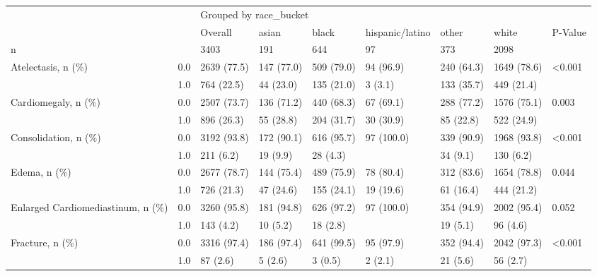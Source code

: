\begin{tabular}{lllllllll}
\toprule
                       &     & \multicolumn{7}{l}{Grouped by race\_bucket} \\
                       &     &                Overall &        asian &       black & hispanic/latino &       other &        white & P-Value \\
\midrule
n & {} &                   3403 &          191 &         644 &              97 &         373 &         2098 &         \\
Atelectasis, n (\%) & 0.0 &            2639 (77.5) &   147 (77.0) &  509 (79.0) &       94 (96.9) &  240 (64.3) &  1649 (78.6) &  <0.001 \\
                       & 1.0 &             764 (22.5) &    44 (23.0) &  135 (21.0) &         3 (3.1) &  133 (35.7) &   449 (21.4) &         \\
Cardiomegaly, n (\%) & 0.0 &            2507 (73.7) &   136 (71.2) &  440 (68.3) &       67 (69.1) &  288 (77.2) &  1576 (75.1) &   0.003 \\
                       & 1.0 &             896 (26.3) &    55 (28.8) &  204 (31.7) &       30 (30.9) &   85 (22.8) &   522 (24.9) &         \\
Consolidation, n (\%) & 0.0 &            3192 (93.8) &   172 (90.1) &  616 (95.7) &      97 (100.0) &  339 (90.9) &  1968 (93.8) &  <0.001 \\
                       & 1.0 &              211 (6.2) &     19 (9.9) &    28 (4.3) &                 &    34 (9.1) &    130 (6.2) &         \\
Edema, n (\%) & 0.0 &            2677 (78.7) &   144 (75.4) &  489 (75.9) &       78 (80.4) &  312 (83.6) &  1654 (78.8) &   0.044 \\
                       & 1.0 &             726 (21.3) &    47 (24.6) &  155 (24.1) &       19 (19.6) &   61 (16.4) &   444 (21.2) &         \\
Enlarged Cardiomediastinum, n (\%) & 0.0 &            3260 (95.8) &   181 (94.8) &  626 (97.2) &      97 (100.0) &  354 (94.9) &  2002 (95.4) &   0.052 \\
                       & 1.0 &              143 (4.2) &     10 (5.2) &    18 (2.8) &                 &    19 (5.1) &     96 (4.6) &         \\
Fracture, n (\%) & 0.0 &            3316 (97.4) &   186 (97.4) &  641 (99.5) &       95 (97.9) &  352 (94.4) &  2042 (97.3) &  <0.001 \\
                       & 1.0 &               87 (2.6) &      5 (2.6) &     3 (0.5) &         2 (2.1) &    21 (5.6) &     56 (2.7) &         \\

\end{tabular}
